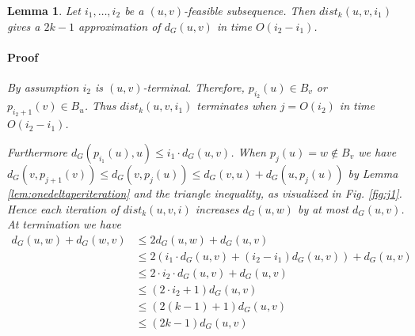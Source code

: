 \documentclass[12pt]{article}
\newtheorem{lem}[thm]{Lemma}
\begin{document}
\begin{lem}
Let $i_1, \hdots, i_2$ be a $(u,v)$-feasible subsequence. Then $dist_k(u,v,i_1)$ gives a $2k-1$ approximation of $d_G(u,v)$ in time $O(i_2-i_1)$.
\paragraph{Proof} By assumption $i_2$ is $(u,v)$-terminal. Therefore, $p_{i_2}(u) \in B_v$ or $p_{i_2 + 1}(v) \in B_u$. Thus $dist_k(u,v,i_1)$ terminates when $j=O(i_2)$ in time $O(i_2-i_1)$.

Furthermore $d_{G}(p_{i_1}(u),u) \leq i_1 \cdot d_G(u,v)$. When $p_j(u) = w \not\in B_v$
we have $d_G(v,p_{j+1}(v)) \leq d_G(v,p_{j}(u)) \leq d_G(v,u) + d_G(u,p_j(u))$ by Lemma \ref{lem:onedeltaperiteration} and the triangle inequality, as visualized in Fig. \ref{fig:j1}. Hence each iteration of $dist_k(u,v,i)$ increases $d_G(u,w)$ by at most $d_G(u,v)$. At termination we have
\begin{align*}
d_G(u,w) + d_G(w,v) &\leq 2d_G(u,w) + d_G(u,v) \\
&\leq 2(i_1 \cdot d_G(u,v) + (i_2 - i_1)d_G(u,v)) + d_G(u,v) \\
&\leq 2 \cdot i_2 \cdot d_G(u,v) + d_G(u,v) \\
&\leq (2 \cdot i_2 + 1)d_G(u,v) \\
&\leq (2 (k-1) + 1)d_G(u,v) \\
&\leq (2k-1) d_G(u,v)
\end{align*}
\end{lem}


\end{document}
